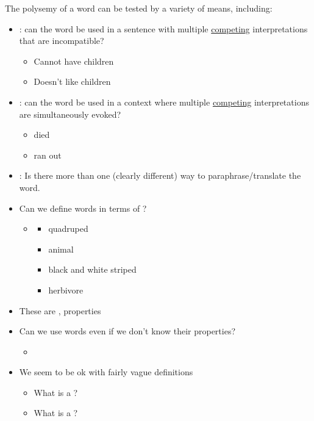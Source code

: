 \documentclass[a4paper,landscape,headrule,footrule,xetex]{foils}
\begin{document}
The polysemy of a word can be tested by a variety of means, including:
\begin{itemize}
\item {}: can the word be used in a sentence with
  multiple \underline{competing} interpretations that are incompatible? \\[1ex]
  \begin{itemize}
  \item Cannot have children
  \item Doesn't like children
  \end{itemize}
\item {}: can the word be used in a context where multiple
  \underline{competing} interpretations are simultaneously evoked? \\[1ex]
    \begin{itemize}
    \item died
    \item ran out
    \end{itemize}
  \task
  \item  {}: Is there more than one (clearly different) way to paraphrase/translate the word.
  \end{itemize}


\begin{itemize}
\item Can we define words in terms of ?
  \begin{itemize}
  \item {}
    \begin{itemize}
    \item quadruped
    \item animal 
    \item black and white striped
    \item herbivore
    \end{itemize}
  \end{itemize}
\item These are ,  properties
\item Can we use words even if we don't know their properties?
  \begin{itemize}
  \item {}
  \end{itemize}
\item We seem to be ok with fairly vague definitions
  \begin{itemize}
  \item What is a ? \task
  \item What is a ? \task
  \end{itemize}
\end{itemize}
\end{document}
